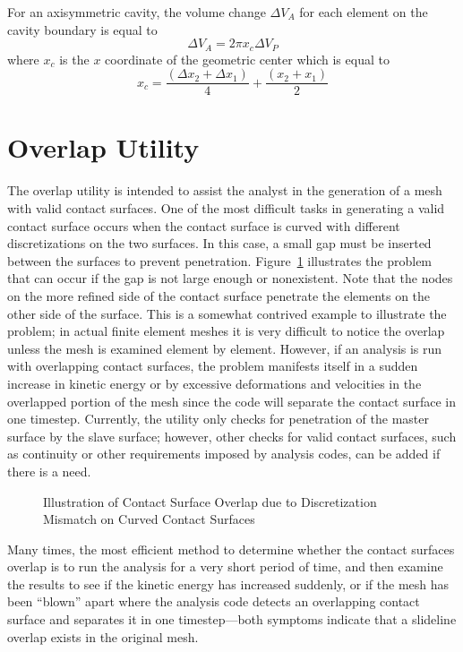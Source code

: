 For an axisymmetric cavity, the volume change $\Delta V_A$ for each
element on the cavity boundary is equal to
\begin{equation}
\Delta V_A = 2\pi x_c \Delta V_P
\end{equation}
where $x_c$ is the $x$ coordinate of the geometric center which is equal
to
\begin{equation}
x_c = \frac{(\Delta x_2 + \Delta x_1)}{4} +
      \frac{(x_2 + x_1)}{2}
\end{equation}

\section{Overlap Utility}\label{sec:overlap}

The overlap utility is intended to assist the analyst in the generation
of a mesh with valid contact surfaces.  One of the most difficult tasks
in generating a valid contact surface occurs when the contact surface is
curved with different discretizations on the two surfaces.  In this
case, a small gap must be inserted between the surfaces to prevent
penetration. Figure~\ref{f:overlap} illustrates the problem that can
occur if the gap is not large enough or nonexistent. Note that the nodes
on the more refined side of the contact surface penetrate the elements
on the other side of the surface.  This is a somewhat contrived example
to illustrate the problem; in actual finite element meshes it is very
difficult to notice the overlap unless the mesh is examined element by
element. However, if an analysis is run with overlapping contact
surfaces, the problem manifests itself in a sudden increase in kinetic
energy or by excessive deformations and velocities in the overlapped
portion of the mesh since the code will separate the contact surface in
one timestep.  Currently, the utility only checks for penetration of the
master surface by the slave surface; however, other checks for valid
contact surfaces, such as continuity or other requirements imposed by
analysis codes, can be added if there is a need.

\begin{figure}
\vspace{3.1in}
\caption{Illustration of Contact Surface Overlap due to
Discretization Mismatch on Curved Contact Surfaces}
\label{f:overlap}
\end{figure}

Many times, the most efficient method to determine whether the contact
surfaces overlap is to run the analysis for a very short period of time,
and then examine the results to see if the kinetic energy has increased
suddenly, or if the mesh has been ``blown'' apart where the analysis
code detects an overlapping contact surface and separates it in one
timestep---both symptoms indicate that a slideline overlap exists in the
original mesh.

